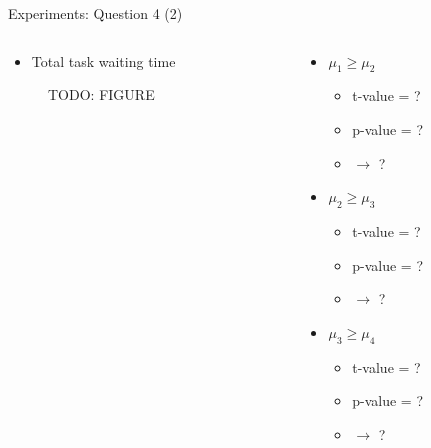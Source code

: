 \begin{frame}{Experiments: Question 4 (2)}
    \begin{columns}

        \begin{column}{0.5\textwidth}
            \begin{itemize}
                \item Total task waiting time
            \end{itemize}

            \begin{figure}[hbt]
                TODO: FIGURE
            \end{figure}
        \end{column}

        \begin{column}{0.5\textwidth}
            \begin{itemize}
                \item $\mu_1 \geq \mu_2$
                    \begin{itemize}
                        \item t-value = ?
                        \item p-value = ?
                        \item $\rightarrow$ ?
                    \end{itemize}

                \item $\mu_2 \geq \mu_3$
                    \begin{itemize}
                        \item t-value = ?
                        \item p-value = ?
                        \item $\rightarrow$ ?
                    \end{itemize}

                \item $\mu_3 \geq \mu_4$
                    \begin{itemize}
                        \item t-value = ?
                        \item p-value = ?
                        \item $\rightarrow$ ?
                    \end{itemize}
            \end{itemize}
        \end{column}

    \end{columns}
\end{frame}

